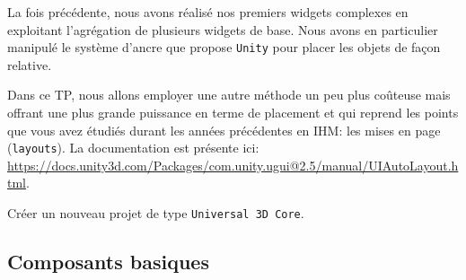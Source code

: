 \documentclass[a4paper,10pt]{article}
\newenvironment{solution}%
{\begin{tcolorbox}[breakable,colback=red!5!white,colframe=red!75!black,title=Solution]}%
{\end{tcolorbox}}
\begin{document}
La fois précédente, nous avons réalisé nos premiers widgets complexes en exploitant l'agrégation de plusieurs widgets de base. Nous avons en particulier manipulé le système d'ancre que propose \texttt{Unity} pour placer les objets de façon relative.

Dans ce TP, nous allons employer une autre méthode un peu plus coûteuse mais offrant une plus grande puissance en terme de placement et qui reprend les points que vous avez étudiés durant les années précédentes en IHM: les mises en page (\texttt{layouts}). La documentation est présente ici: \url{https://docs.unity3d.com/Packages/com.unity.ugui@2.5/manual/UIAutoLayout.html}.

\ifversionenseignant
\begin{solution}
Créer un nouveau projet de type \texttt{Universal 3D Core}.
	
\end{solution}
\fi 

\subsection*{Composants basiques}
\end{document}
